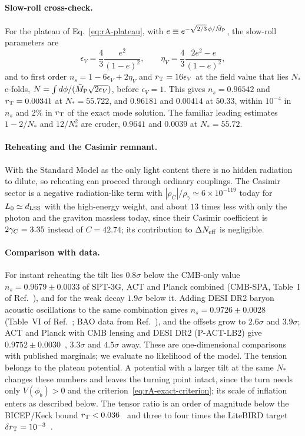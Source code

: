 \paragraph{Slow-roll cross-check.}
For the plateau of Eq.~\eqref{eq:rA-plateau}, with $e\equiv e^{-\sqrt{2/3}\,\phi/\bar M_{\mathrm{P}}}$, the slow-roll parameters are
\begin{equation}
\epsilon_V=\frac43\frac{e^2}{(1-e)^2},\qquad \eta_V=\frac43\frac{2e^2-e}{(1-e)^2},
\end{equation}
and to first order $n_s=1-6\epsilon_V+2\eta_V$ and $r_{\mathrm{T}}=16\epsilon_V$ at the field value that lies $N_*$ e-folds, $N=\int d\phi/(\bar M_{\mathrm{P}}\sqrt{2\epsilon_V})$, before $\epsilon_V=1$.
This gives $n_s=0.96542$ and $r_{\mathrm{T}}=0.00341$ at $N_*=55.722$, and $0.96181$ and $0.00414$ at $50.33$, within $10^{-4}$ in $n_s$ and $2\%$ in $r_{\mathrm{T}}$ of the exact mode solution. %
The familiar leading estimates $1-2/N_*$ and $12/N_*^2$ are cruder, $0.9641$ and $0.0039$ at $N_*=55.72$. %

\paragraph{Reheating and the Casimir remnant.}
With the Standard Model as the only light content there is no hidden radiation to dilute, so reheating can proceed through ordinary couplings.
The Casimir sector is a negative radiation-like term with $|\rho_C|/\rho_\gamma\simeq6\times10^{-119}$ today for $L_0\simeq d_{\mathrm{LSS}}$ with the high-energy weight, and about $13$ times less with only the photon and the graviton massless today, since their Casimir coefficient is $2\gamma_C=3.35$ instead of $C=42.74$; its contribution to $\Delta N_{\rm eff}$ is negligible. %

\paragraph{Comparison with data.}
For instant reheating the tilt lies $0.8\sigma$ below the CMB-only value $n_s=0.9679\pm0.0033$ of SPT-3G, ACT and Planck combined (CMB-SPA, Table~I of Ref.~\cite{SPT-3G:2025bzu}), and for the weak decay $1.9\sigma$ below it. %
Adding DESI DR2 baryon acoustic oscillations to the same combination gives $n_s=0.9726\pm0.0028$ (Table~VI of Ref.~\cite{SPT-3G:2025bzu}; BAO data from Ref.~\cite{DESI:2025zgx}), and the offsets grow to $2.6\sigma$ and $3.9\sigma$; ACT and Planck with CMB lensing and DESI DR2 (P-ACT-LB2) give $0.9752\pm0.0030$~\cite{AtacamaCosmologyTelescope:2025blo}, $3.3\sigma$ and $4.5\sigma$ away. %
These are one-dimensional comparisons with published marginals; we evaluate no likelihood of the model.
The tension belongs to the plateau potential.
A potential with a larger tilt at the same $N_*$ changes these numbers and leaves the turning point intact, since the turn needs only $V(\phi_b)>0$ and the criterion~\eqref{eq:rA-exact-criterion}; its scale of inflation enters as described below.
The tensor ratio is an order of magnitude below the BICEP/Keck bound $r_{\mathrm{T}}<0.036$~\cite{BICEP:2021xfz} and three to four times the LiteBIRD target $\delta r_{\mathrm{T}}=10^{-3}$~\cite{LiteBIRD:2022cnt}. %

